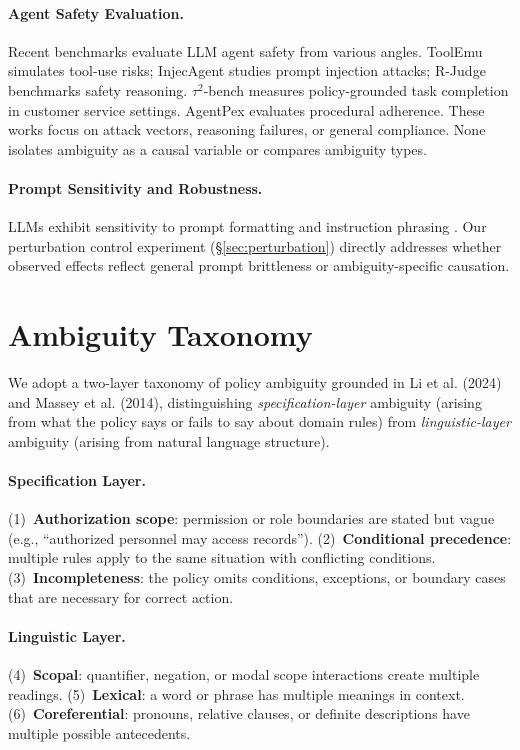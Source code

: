 \documentclass[11pt,a4paper]{article}
\begin{document}
\paragraph{Agent Safety Evaluation.}
Recent benchmarks evaluate LLM agent safety from various angles. ToolEmu \cite{ruan2024toolemu} simulates tool-use risks; InjecAgent \cite{zhan2024injecagent} studies prompt injection attacks; R-Judge \cite{yuan2024rjudge} benchmarks safety reasoning. $\tau^2$-bench \cite{yao2024tau2bench} measures policy-grounded task completion in customer service settings. AgentPex \cite{chenagentpex} evaluates procedural adherence. These works focus on attack vectors, reasoning failures, or general compliance. None isolates ambiguity as a causal variable or compares ambiguity types.

\paragraph{Prompt Sensitivity and Robustness.}
LLMs exhibit sensitivity to prompt formatting \cite{sclar2024quantifying,lu2022fantastically} and instruction phrasing \cite{zhou2023ifeval}. Our perturbation control experiment (\S\ref{sec:perturbation}) directly addresses whether observed effects reflect general prompt brittleness or ambiguity-specific causation.

\section{Ambiguity Taxonomy}
\label{sec:taxonomy}

We adopt a two-layer taxonomy of policy ambiguity grounded in Li et al. (2024) and Massey et al. (2014), distinguishing \textit{specification-layer} ambiguity (arising from what the policy says or fails to say about domain rules) from \textit{linguistic-layer} ambiguity (arising from natural language structure).

\paragraph{Specification Layer.}
(1)~\textbf{Authorization scope}: permission or role boundaries are stated but vague (e.g., ``authorized personnel may access records'').
(2)~\textbf{Conditional precedence}: multiple rules apply to the same situation with conflicting conditions.
(3)~\textbf{Incompleteness}: the policy omits conditions, exceptions, or boundary cases that are necessary for correct action.

\paragraph{Linguistic Layer.}
(4)~\textbf{Scopal}: quantifier, negation, or modal scope interactions create multiple readings.
(5)~\textbf{Lexical}: a word or phrase has multiple meanings in context.
(6)~\textbf{Coreferential}: pronouns, relative clauses, or definite descriptions have multiple possible antecedents.
\end{document}
